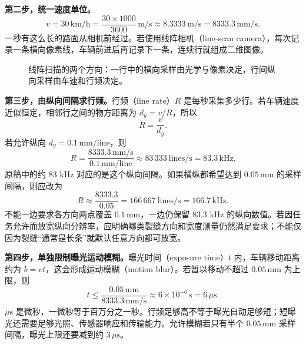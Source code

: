 \textbf{第二步，统一速度单位。}
\[
 v=30\,\mathrm{km/h}
  =\frac{30\times1000}{3600}\,\mathrm{m/s}
  \approx8.3333\,\mathrm{m/s}
  =8333.3\,\mathrm{mm/s}.
\]
一秒有这么长的路面从相机前经过。若使用线阵相机（line-scan camera），每次记录一条横向像素线，车辆前进后再记录下一条，连续行就组成二维图像。

\begin{figure}[htbp]
\centering
{}
\caption{线阵扫描的两个方向：一行中的横向采样由光学与像素决定，行间纵向采样由车速和行频决定。}
\end{figure}

\textbf{第三步，由纵向间隔求行频。}行频（line rate）$R$ 是每秒采集多少行。若车辆速度近似恒定，相邻行之间的物方距离为 $d_y=v/R$，所以
\[
 R=\frac{v}{d_y}.
\]
若允许纵向 $d_y=0.1\,\mathrm{mm/line}$，则
\[
 R=\frac{8333.3\,\mathrm{mm/s}}{0.1\,\mathrm{mm/line}}
  \approx83\,333\ \mathrm{lines/s}
  =83.3\,\mathrm{kHz}.
\]
原稿中的约 83 kHz 对应的是这个纵向间隔。如果横纵都希望达到 $0.05\,\mathrm{mm}$ 的采样间隔，则应改为
\[
 R\approx\frac{8333.3}{0.05}
  =166\,667\ \mathrm{lines/s}=166.7\,\mathrm{kHz}.
\]
不能一边要求各方向两点覆盖 $0.1\,\mathrm{mm}$，一边仍保留 83.3 kHz 的纵向数值。若因任务允许而放宽纵向分辨率，应明确哪类裂缝方向和宽度测量仍然满足要求；不能仅因为裂缝“通常是长条”就默认任意方向都可放宽。

\textbf{第四步，单独限制曝光运动模糊。}曝光时间（exposure time）$t$ 内，车辆移动距离约为 $b=vt$，这会形成运动模糊（motion blur）。若暂以移动不超过 $0.05\,\mathrm{mm}$ 为上限，则
\[
 t\leq\frac{0.05\,\mathrm{mm}}{8333.3\,\mathrm{mm/s}}
   \approx6\times10^{-6}\,\mathrm{s}=6\,\mu\mathrm{s}.
\]
$\mu\mathrm{s}$ 是微秒，一微秒等于百万分之一秒。行频足够高不等于曝光自动足够短；短曝光还需要足够光照、传感器响应和传输能力。允许模糊若只有半个 $0.05\,\mathrm{mm}$ 采样间隔，曝光上限还要减到约 $3\,\mu\mathrm{s}$。

